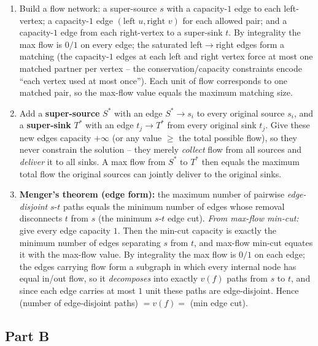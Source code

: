 \documentclass[11pt]{article}
\begin{document}
\begin{enumerate}[label=\textbf{A\arabic*.}, leftmargin=2.2em]
\item Build a flow network: a super-source $s$ with a capacity-$1$ edge to each
left-vertex; a capacity-$1$ edge $(\text{left } u, \text{right } v)$ for each allowed pair;
and a capacity-$1$ edge from each right-vertex to a super-sink $t$. By integrality the max
flow is $0/1$ on every edge; the saturated left$\to$right edges form a matching (the
capacity-$1$ edges at each left and right vertex force at most one matched partner per
vertex -- the conservation/capacity constraints encode ``each vertex used at most once'').
Each unit of flow corresponds to one matched pair, so the max-flow value equals the maximum
matching size.

\item Add a \textbf{super-source} $S^*$ with an edge $S^*\to s_i$ to every original source
$s_i$, and a \textbf{super-sink} $T^*$ with an edge $t_j\to T^*$ from every original sink
$t_j$. Give these new edges capacity $+\infty$ (or any value $\ge$ the total possible
flow), so they never constrain the solution -- they merely \emph{collect} flow from all
sources and \emph{deliver} it to all sinks. A max flow from $S^*$ to $T^*$ then equals the
maximum total flow the original sources can jointly deliver to the original sinks.

\item \textbf{Menger's theorem (edge form):} the maximum number of pairwise
\emph{edge-disjoint} $s$-$t$ paths equals the minimum number of edges whose removal
disconnects $t$ from $s$ (the minimum $s$-$t$ edge cut). \emph{From max-flow min-cut:} give
every edge capacity $1$. Then the min-cut capacity is exactly the minimum number of edges
separating $s$ from $t$, and max-flow min-cut equates it with the max-flow value. By
integrality the max flow is $0/1$ on each edge; the edges carrying flow form a subgraph in
which every internal node has equal in/out flow, so it \emph{decomposes} into exactly
$v(f)$ paths from $s$ to $t$, and since each edge carries at most $1$ unit these paths are
edge-disjoint. Hence (number of edge-disjoint paths) $= v(f) = $ (min edge cut).

\end{enumerate}

\subsection*{Part B}
\end{document}
